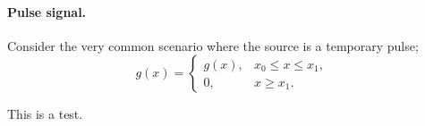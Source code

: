     \paragraph{Pulse signal.} Consider the very common scenario where the source is a temporary pulse;
    \begin{equation}
        g(x) = \begin{cases}
            g(x), & x_0 \leq x \leq x_1, \\
            0, & x\geq x_1.
        \end{cases}
    \end{equation}

    This is a test.





    
    




